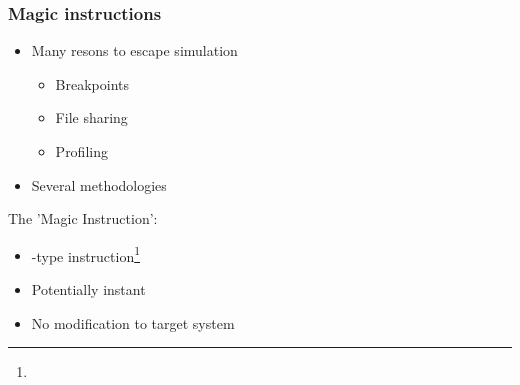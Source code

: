 
\begin{frame}
\frametitle{Magic instructions}

\begin{itemize}
	\item Many resons to escape simulation
	\begin{itemize}
		\item Breakpoints
		\item File sharing
		\item Profiling
	\end{itemize}
	\item Several methodologies
\end{itemize}

The 'Magic Instruction':
\begin{itemize}
	\item {}-type instruction\footnote{}
	\item Potentially instant
	\item No modification to target system
\end{itemize}

\end{frame}